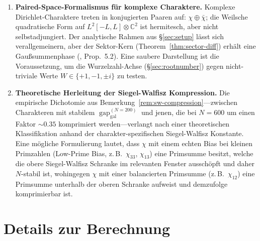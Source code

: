 \documentclass[a4paper,10pt,twocolumn]{article}
\theoremstyle{definition}
\theoremstyle{remark}
\newcommand{\gap}{\operatorname{gap}}
\newcommand{\chifn}{\chi}
\begin{document}
\begin{enumerate}
    Paritäts-/Wurzelzahl-/archimedischen Klassifikation gegen eine
    Verteilung der beobachteten Gap-Vorzeichen ermöglichen. Die Galerkin-Kosten liegen bei
    $\mathcal{O}(D\cdot N^3)$; bei $N=600$ bedeutet dies $\sim 10$ Stunden
    CCX13-Rechenzeit pro zehn Charaktere, also einen Wochenend-Lauf.
  \item \textbf{Paired-Space-Formalismus für komplexe Charaktere.}
    Komplexe Dirichlet-Charaktere treten in konjugierten Paaren auf:
    $\chifn\oplus\bar\chifn$; die Weilsche quadratische Form auf
    $L^2[-L,L]\otimes\mathbb{C}^2$ ist hermitesch, aber nicht
    selbstadjungiert. Der analytische Rahmen aus \S\ref{sec:setup}
    lässt sich verallgemeinern, aber der Sektor-Kern
    (Theorem~\ref{thm:sector-diff}) erhält eine Gaußsummenphase
    (\cite{AnalyticKernel}, Prop.~5.2). Eine saubere Darstellung ist
    die Voraussetzung, um die Wurzelzahl-Achse
    (\S\ref{sec:rootnumber}) gegen nicht-triviale Werte $W\in
    \{+1,-1,\pm i\}$ zu testen.
  \item \textbf{Theoretische Herleitung der Siegel-Walfisz
    Kompression.} Die empirische Dichotomie aus
    Bemerkung~\ref{rem:sw-compression}---zwischen Charakteren mit
    stabilem $\gap_{\mathrm{gal}}^{(N=200)}$ und jenen, die bei $N=600$
    um einen Faktor $\sim 0.35$ komprimiert werden---verlangt nach einer
    theoretischen Klassifikation anhand der charakter-spezifischen
    Siegel-Walfisz Konstante. Eine mögliche Formulierung lautet,
    dass $\chifn$ mit einem echten Bias bei kleinen Primzahlen (Low-Prime Bias, z.\,B.\ $\chifn_{33}$,
    $\chifn_{13}$) eine Primsumme besitzt, welche die
    obere Siegel-Walfisz Schranke im relevanten Fenster ausschöpft und
    daher $N$-stabil ist, wohingegen $\chifn$ mit einer balancierten Primsumme
    (z.\,B.\ $\chifn_{12}$) eine Primsumme unterhalb der oberen
    Schranke aufweist und demzufolge komprimierbar ist.
\end{enumerate}

\appendix

\section{Details zur Berechnung}
\label{app:computation}
\end{document}
